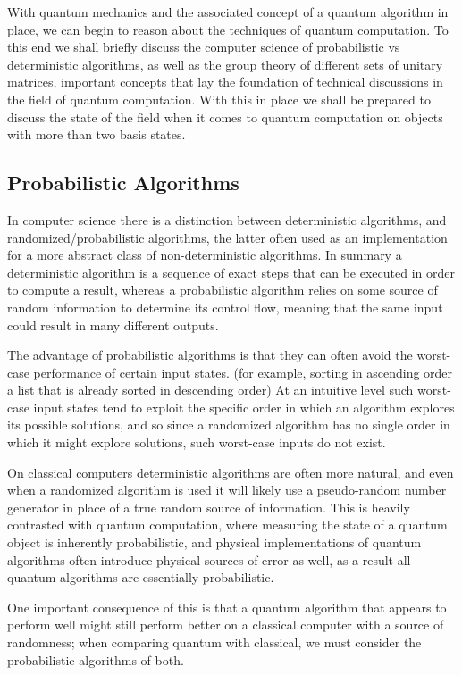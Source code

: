 With quantum mechanics and the associated concept of a quantum algorithm in place, we can begin to reason about the techniques of quantum computation. To this end we shall briefly discuss the computer science of probabilistic vs deterministic algorithms, as well as the group theory of different sets of unitary matrices, important concepts that lay the foundation of technical discussions in the field of quantum computation. With this in place we shall be prepared to discuss the state of the field when it comes to quantum computation on objects with more than two basis states.

\subsection{Probabilistic Algorithms}
In computer science there is a distinction between deterministic algorithms, and randomized/probabilistic algorithms, the latter often used as an implementation for a more abstract class of non-deterministic algorithms. In summary a deterministic algorithm is a sequence of exact steps that can be executed in order to compute a result, whereas a probabilistic algorithm relies on some source of random information to determine its control flow, meaning that the same input could result in many different outputs.

The advantage of probabilistic algorithms is that they can often avoid the worst-case performance of certain input states. (for example, sorting in ascending order a list that is already sorted in descending order) At an intuitive level such worst-case input states tend to exploit the specific order in which an algorithm explores its possible solutions, and so since a randomized algorithm has no single order in which it might explore solutions, such worst-case inputs do not exist.

On classical computers deterministic algorithms are often more natural, and even when a randomized algorithm is used it will likely use a pseudo-random number generator in place of a true random source of information. This is heavily contrasted with quantum computation, where measuring the state of a quantum object is inherently probabilistic, and physical implementations of quantum algorithms often introduce physical sources of error as well, as a result all quantum algorithms are essentially probabilistic.

One important consequence of this is that a quantum algorithm that appears to perform well might still perform better on a classical computer with a source of randomness; when comparing quantum with classical, we must consider the probabilistic algorithms of both.

